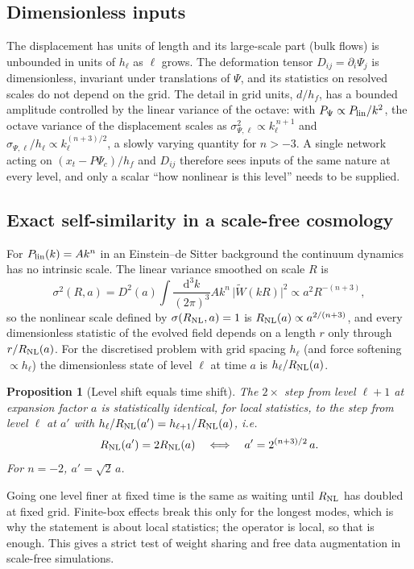 \documentclass[11pt]{article}
\newtheorem{proposition}{Proposition}[section]
\theoremstyle{definition}
\newcommand{\Psic}{\Psi_{c}}
\newcommand{\dd}{\mathrm{d}}
\newcommand{\lin}{{\rm lin}}
\begin{document}
\subsection{Dimensionless inputs}

The displacement has units of length and its large-scale part (bulk flows) is unbounded in units of $h_\ell$ as $\ell$ grows. The deformation tensor $D_{ij}=\partial_i\Psi_j$ is dimensionless, invariant under translations of $\Psi$, and its statistics on resolved scales do not depend on the grid. The detail in grid units, $d/h_f$, has a bounded amplitude controlled by the linear variance of the octave: with $P_\Psi\propto P_\lin/k^2$, the octave variance of the displacement scales as $\sigma_{\Psi,\ell}^2\propto k_\ell^{\,n+1}$ and $\sigma_{\Psi,\ell}/h_\ell\propto k_\ell^{(n+3)/2}$, a slowly varying quantity for $n>-3$. A single network acting on $(x_t-P\Psic)/h_f$ and $D_{ij}$ therefore sees inputs of the same nature at every level, and only a scalar ``how nonlinear is this level'' needs to be supplied.

\subsection{Exact self-similarity in a scale-free cosmology}

For $P_\lin(k)=Ak^n$ in an Einstein--de Sitter background the continuum dynamics has no intrinsic scale. The linear variance smoothed on scale $R$ is
\begin{equation}
\sigma^2(R,a)=D^2(a)\int\frac{\dd^3k}{(2\pi)^3}Ak^n\,\big|\tilde W(kR)\big|^2\propto a^2R^{-(n+3)} ,
\end{equation}
so the nonlinear scale defined by $\sigma(R_{\rm NL},a)=1$ is $R_{\rm NL}(a)\propto a^{2/(n+3)}$, and every dimensionless statistic of the evolved field depends on a length $r$ only through $r/R_{\rm NL}(a)$. For the discretised problem with grid spacing $h_\ell$ (and force softening $\propto h_\ell$) the dimensionless state of level $\ell$ at time $a$ is $h_\ell/R_{\rm NL}(a)$.

\begin{proposition}[Level shift equals time shift]
The $2\times$ step from level $\ell+1$ at expansion factor $a$ is statistically identical, for local statistics, to the step from level $\ell$ at $a'$ with $h_\ell/R_{\rm NL}(a')=h_{\ell+1}/R_{\rm NL}(a)$, i.e.
\begin{equation}
R_{\rm NL}(a')=2R_{\rm NL}(a)\quad\Longleftrightarrow\quad a'=2^{(n+3)/2}\,a .
\end{equation}
For $n=-2$, $a'=\sqrt2\,a$.
\end{proposition}
Going one level finer at fixed time is the same as waiting until $R_{\rm NL}$ has doubled at fixed grid. Finite-box effects break this only for the longest modes, which is why the statement is about local statistics; the operator is local, so that is enough. This gives a strict test of weight sharing and free data augmentation in scale-free simulations.
\end{document}
